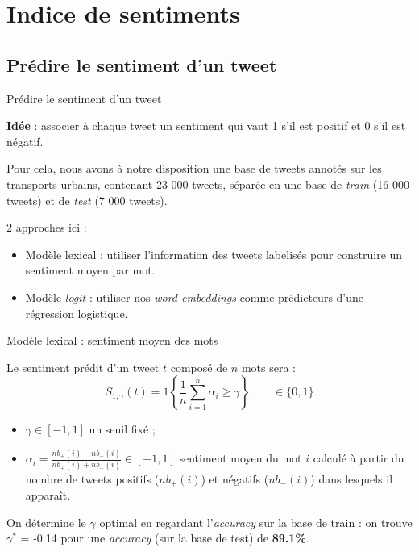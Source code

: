 \documentclass[10pt,xcolor=table,color={dvipsnames,usenames},ignorenonframetext,usepdftitle=false,french]{beamer}
\begin{document}
\section{Indice de sentiments}\label{indice-de-sentiments}

\subsection{Prédire le sentiment d'un
tweet}\label{pruxe9dire-le-sentiment-dun-tweet}

\begin{frame}{Prédire le sentiment d'un tweet}

\textbf{Idée} : associer à chaque tweet un sentiment qui vaut 1 s'il est
positif et 0 s'il est négatif.

Pour cela, nous avons à notre disposition une base de tweets annotés sur
les transports urbains, contenant 23 000 tweets, séparée en une base de
\emph{train} (16 000 tweets) et de \emph{test} (7 000 tweets).

2 approches ici :

\begin{itemize}
\item Modèle lexical : utiliser l'information des tweets labelisés pour construire un sentiment moyen par mot.
\item Modèle \textit{logit} : utiliser nos \textit{word-embeddings} comme prédicteurs d'une régression logistique.
\end{itemize}

\end{frame}

\begin{frame}{Modèle lexical : sentiment moyen des mots}

Le sentiment prédit d'un tweet \(t\) composé de \(n\) mots sera :
\[S_{1,\gamma}(t) = 1\left\{ \frac{1}{n} \sum \limits_{i=1}^n \alpha_i \geq \gamma\right\}  \qquad \in \{ 0,1 \}\]

\begin{itemize}
\item $\gamma \in [-1,1]$ un seuil fixé ;
\item $\alpha_i = \frac{nb_+(i) - nb_-(i)}{nb_+(i) + nb_-(i)} \in [-1,1]$  sentiment moyen du mot $i$ calculé à partir du nombre de tweets positifs ($nb_+(i)$) et négatifs ($nb_-(i)$) dans lesquels il apparaît. 
\end{itemize}

On détermine le \(\gamma\) optimal en regardant l'\emph{accuracy} sur la
base de train : on trouve \(\gamma^*\) = -0.14 pour une \emph{accuracy}
(sur la base de test) de \textbf{89.1\%}.

\end{frame}
\end{document}
